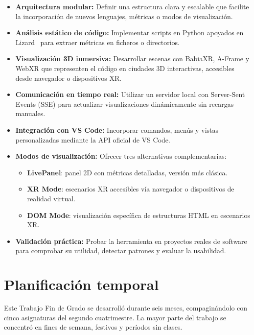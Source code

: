 \documentclass[a4paper, 12pt]{book}
\begin{document}
\begin{itemize}
    \item \textbf{Arquitectura modular:} Definir una estructura clara y escalable que facilite la incorporación de nuevos lenguajes, métricas o modos de visualización.
    \item \textbf{Análisis estático de código:} Implementar scripts en Python apoyados en Lizard~\cite{lizard} para extraer métricas en ficheros o directorios.
    \item \textbf{Visualización 3D inmersiva:} Desarrollar escenas con BabiaXR, A-Frame y WebXR que representen el código en ciudades 3D interactivas, accesibles desde navegador o dispositivos XR.
    \item \textbf{Comunicación en tiempo real:} Utilizar un servidor local con Server-Sent Events (SSE) para actualizar visualizaciones dinámicamente sin recargas manuales.
    \item \textbf{Integración con VS Code:} Incorporar comandos, menús y vistas personalizadas mediante la API oficial de VS Code.
    \item \textbf{Modos de visualización:} Ofrecer tres alternativas complementarias:
    \begin{itemize}
        \item \textbf{LivePanel}: panel 2D con métricas detalladas, versión más clásica.
        \item \textbf{XR Mode}: escenarios XR accesibles vía navegador o dispositivos de realidad virtual.
        \item \textbf{DOM Mode}: visualización específica de estructuras HTML en escenarios XR.
    \end{itemize}
    \item \textbf{Validación práctica:} Probar la herramienta en proyectos reales de software para comprobar su utilidad, detectar patrones y evaluar la usabilidad.
\end{itemize}

\section{Planificación temporal}
\label{sec:planificacion-temporal}

Este Trabajo Fin de Grado se desarrolló durante seis meses, compaginándolo con cinco asignaturas del segundo cuatrimestre. La mayor parte del trabajo se concentró en fines de semana, festivos y períodos sin clases.
\end{document}
